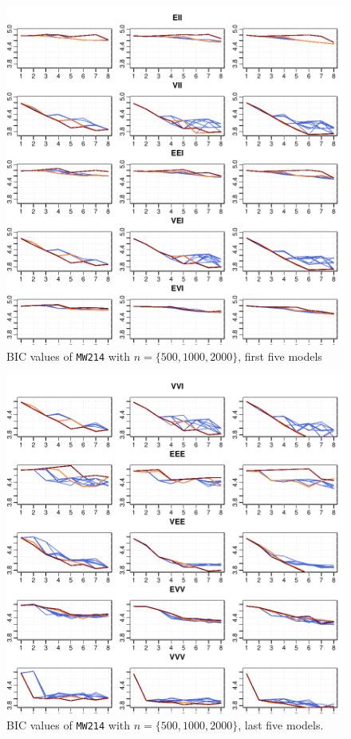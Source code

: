 \begin{figure}[h!]
    \centering
\includegraphics{App_plots-figmw21bicfirst}
    \caption{BIC values of {\tt MW214} with $n=\{500, 1000, 2000\}$, first five models}
    \label{fig:bicmw34first}
\end{figure}

\begin{figure}[h!]
    \centering
\includegraphics{App_plots-figmw21bicsecond}
    \caption{BIC values of {\tt MW214} with $n=\{500, 1000, 2000\}$, last five models.}
    \label{fig:bicmw34second}
\end{figure}

